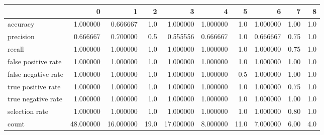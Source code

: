 \begin{tabular}{lrrrrrrrrr}
\toprule
{} &          0 &          1 &     2 &          3 &         4 &     5 &         6 &     7 &    8 \\
\midrule
accuracy            &   1.000000 &   0.666667 &   1.0 &   1.000000 &  1.000000 &   1.0 &  1.000000 &  1.00 &  1.0 \\
precision           &   0.666667 &   0.700000 &   0.5 &   0.555556 &  0.666667 &   1.0 &  0.666667 &  0.75 &  1.0 \\
recall              &   1.000000 &   1.000000 &   1.0 &   1.000000 &  1.000000 &   1.0 &  1.000000 &  0.75 &  1.0 \\
false positive rate &   1.000000 &   1.000000 &   1.0 &   1.000000 &  1.000000 &   1.0 &  1.000000 &  1.00 &  1.0 \\
false negative rate &   1.000000 &   1.000000 &   1.0 &   1.000000 &  1.000000 &   0.5 &  1.000000 &  1.00 &  1.0 \\
true positive rate  &   1.000000 &   1.000000 &   1.0 &   1.000000 &  1.000000 &   1.0 &  1.000000 &  0.75 &  1.0 \\
true negative rate  &   1.000000 &   1.000000 &   1.0 &   1.000000 &  1.000000 &   1.0 &  1.000000 &  1.00 &  1.0 \\
selection rate      &   1.000000 &   1.000000 &   1.0 &   1.000000 &  1.000000 &   1.0 &  1.000000 &  0.80 &  1.0 \\
count               &  48.000000 &  16.000000 &  19.0 &  17.000000 &  8.000000 &  11.0 &  7.000000 &  6.00 &  4.0 \\
\bottomrule
\end{tabular}
